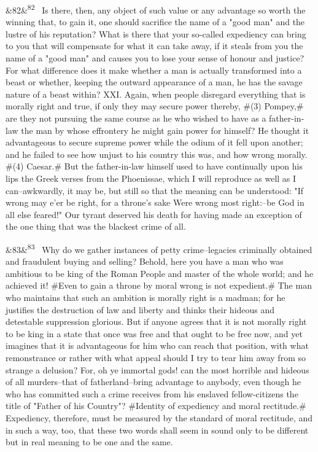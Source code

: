 \documentclass[12pt]{article}
\newcommand{\para}[1][]{\par\noindent\ifx&#1&\else\textsuperscript{\footnotesize #1}~\fi}
\begin{document}
\para[82] Is there, then, any object of such value or any advantage so worth the winning that, to gain it, one should sacrifice the name of a "good man" and the lustre of his reputation? What is there that your so-called expediency can bring to you that will compensate for what it can take away, if it steals from you the name of a "good man" and causes you to lose your sense of honour and justice? For what difference does it make whether a man is actually transformed into a beast or whether, keeping the outward appearance of a man, he has the savage nature of a beast within? XXI. Again, when people disregard everything that is morally right and true, if only they may secure power thereby, \#(3) Pompey,\# are they not pursuing the same course as he who wished to have as a father-in-law the man by whose effrontery he might gain power for himself? He thought it advantageous to secure supreme power while the odium of it fell upon another; and he failed to see how unjust to his country this was, and how wrong morally. \#(4) Caesar.\# But the father-in-law himself used to have continually upon his lips the Greek verses from the Phoenissae, which I will reproduce as well as I can--awkwardly, it may be, but still so that the meaning can be understood: "If wrong may e'er be right, for a throne's sake Were wrong most right:--be God in all else feared!" Our tyrant deserved his death for having made an exception of the one thing that was the blackest crime of all.

\para[83] Why do we gather instances of petty crime--legacies criminally obtained and fraudulent buying and selling? Behold, here you have a man who was ambitious to be king of the Roman People and master of the whole world; and he achieved it! \#Even to gain a throne by moral wrong is not expedient.\# The man who maintains that such an ambition is morally right is a madman; for he justifies the destruction of law and liberty and thinks their hideous and detestable suppression glorious. But if anyone agrees that it is not morally right to be king in a state that once was free and that ought to be free now, and yet imagines that it is advantageous for him who can reach that position, with what remonstrance or rather with what appeal should I try to tear him away from so strange a delusion? For, oh ye immortal gods! can the most horrible and hideous of all murders--that of fatherland--bring advantage to anybody, even though he who has committed such a crime receives from his enslaved fellow-citizens the title of "Father of his Country"? \#Identity of expediency and moral rectitude.\# Expediency, therefore, must be measured by the standard of moral rectitude, and in such a way, too, that these two words shall seem in sound only to be different but in real meaning to be one and the same.
\end{document}
